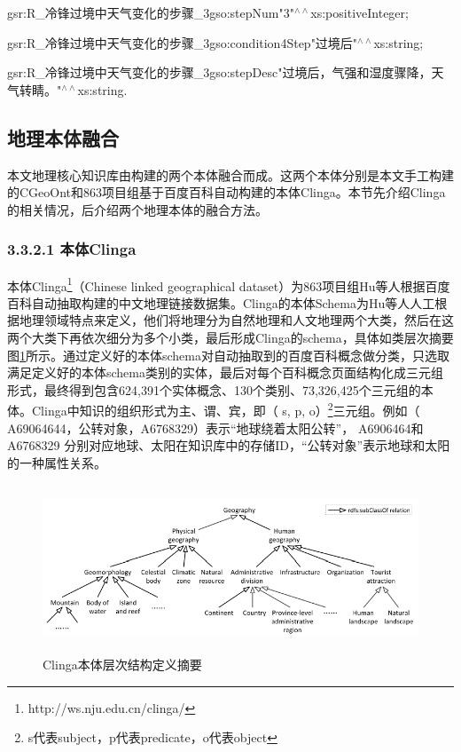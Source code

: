 gsr:R\_冷锋过境中天气变化的步骤\_3\quad gso:stepNum\quad "3"$^{\land\land}$xs:positiveInteger\quad ;

gsr:R\_冷锋过境中天气变化的步骤\_3\quad gso:condition4Step\quad "过境后"$^{\land\land}$xs:string\quad ;

gsr:R\_冷锋过境中天气变化的步骤\_3\quad gso:stepDesc\quad "过境后，气强和湿度骤降，天气转睛。"$^{\land\land}$xs:string\quad .

\subsection{地理本体融合}
本文地理核心知识库由构建的两个本体融合而成。这两个本体分别是本文手工构建的CGeoOnt和863项目组基于百度百科自动构建的本体Clinga。本节先介绍Clinga的相关情况，后介绍两个地理本体的融合方法。

\subsubsection{3.3.2.1 本体Clinga}

本体Clinga\footnote{http://ws.nju.edu.cn/clinga/}（Chinese linked geographical dataset）为863项目组Hu\cite{Hu}等人根据百度百科自动抽取构建的中文地理链接数据集。Clinga的本体Schema为Hu等人人工根据地理领域特点来定义，他们将地理分为自然地理和人文地理两个大类，然后在这两个大类下再依次细分为多个小类，最后形成Clinga的schema，具体如类层次摘要图\ref{fig:clinga}所示。通过定义好的本体schema对自动抽取到的百度百科概念做分类，只选取满足定义好的本体schema类别的实体，最后对每个百科概念页面结构化成三元组形式，最终得到包含624,391个实体概念、130个类别、73,326,425个三元组的本体。Clinga中知识的组织形式为主、谓、宾，即（ s, p, o）\footnote{s代表subject，p代表predicate，o代表object}三元组。例如（ A69064644，公转对象，A6768329）表示“地球绕着太阳公转”， A6906464和 A6768329 分别对应地球、太阳在知识库中的存储ID，“公转对象”表示地球和太阳的一种属性关系。

\begin{figure}[!htb]
	\centering\includegraphics[height=5cm]{resource/clinga}
	\caption{Clinga本体层次结构定义摘要}
	\label{fig:clinga}
\end{figure}

